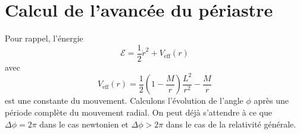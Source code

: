 \documentclass[a4paper,11pt]{report}
\begin{document}
    \section{Calcul de l'avancée du périastre}
    
        Pour rappel, l'énergie
        \begin{equation}
            \mathscr{E} = \frac{1}{2}\dot{r}^2+V_{\text{eff}}(r)
        \end{equation}
        avec
        \begin{equation}
            V_{\text{eff}}(r) = \frac{1}{2}\left( 1-\frac{M}{r} \right)\frac{L^2}{r^2}-\frac{M}{r}
        \end{equation}
        est une constante du mouvement. Calculons l'évolution de l'angle $\phi$ après une période complète du mouvement radial. On peut déjà s'attendre à ce que $\Delta\phi = 2\pi$ dans le cas newtonien et $\Delta\phi>2\pi$ dans le cas de la relativité générale.\\
        
\end{document}
